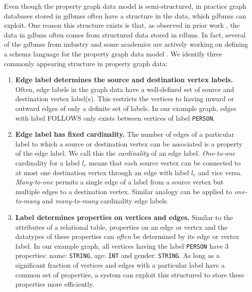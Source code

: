 \begin{guideline}
	\label{gdln:graph-schema}
	Even though the property graph data model is semi-structured, in practice graph databases stored in \gls{gdbms}s often have a structure in the data, which \gls{gdbms}s can exploit. One reason this structure exists is that, as observed in prior work \cite{survey}, the data in \gls{gdbms} often comes from structured data stored in \gls{rdbms}. In fact, several of the \gls{gdbms}s from industry and some academics are actively working on defining a schema language for the property graph data model \cite{schema-validation-bonifati, defining-schema-hartig}. We identify three commonly appearing structure in property graph data:
	
	\begin{enumerate}
		
		\item \textbf{Edge label determines the source and destination vertex labels.} Often, edge labels in the graph data have a well-defined set of source and destination vertex label(s). This restricts the vertices to having inward or outward edges of only a definite set of labels. In our example graph, edges with label FOLLOWS only exists between vertices of label \texttt{PERSON}.
		
		\item \textbf{Edge label has fixed cardinality.} The number of edges of a particular label to which a source or destination vertex can be associated is a property of the edge label. We call this the \emph{cardinality} of an edge label. \emph{One-to-one} cardinality for a label $l_e$ means that each source vertex can be connected to at most one destination vertex through an edge with label $l_e$ and vice versa. \emph{Many-to-one} permits a single edge of a label from a source vertex but multiple edges to a destination vertex. Similar analogy can be applied to \emph{one-to-many} and \emph{many-to-many} cardinality edge labels.
		
		\item \textbf{Label determines properties on vertices and edges.} Similar to the attributes of a relational table, properties on an edge or vertex and the datatypes of these properties can \emph{often} be determined by its edge or vertex label. In our example graph, all vertices having the label \texttt{PERSON} have 3 properties: name: \texttt{STRING}, age: \texttt{INT} and gender: \texttt{STRING}. As long as a significant fraction of vertices and edges with a particular label have a common set of properties, a system can exploit this structured to store these properties more efficiently. 
		

\end{enumerate}
\end{guideline}
